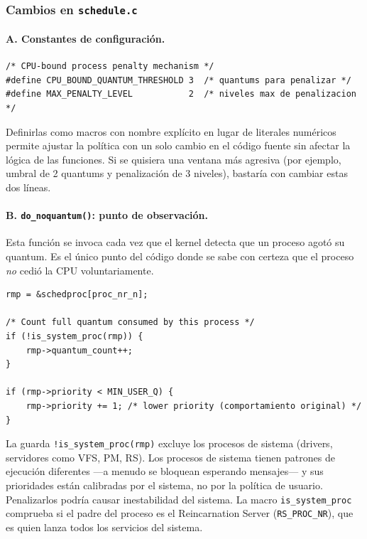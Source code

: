 \documentclass[11pt,a4paper]{article}
\begin{document}
\subsubsection*{Cambios en \texttt{schedule.c}}

\paragraph{A. Constantes de configuraci\'on.}\leavevmode\par

\begin{lstlisting}[style=cstyle,caption={Constantes de la pol\'itica de penalizaci\'on}]
/* CPU-bound process penalty mechanism */
#define CPU_BOUND_QUANTUM_THRESHOLD 3  /* quantums para penalizar */
#define MAX_PENALTY_LEVEL           2  /* niveles max de penalizacion */
\end{lstlisting}

Definirlas como macros con nombre expl\'icito en lugar de literales num\'ericos permite ajustar la pol\'itica con un solo cambio en el c\'odigo fuente sin afectar la l\'ogica de las funciones. Si se quisiera una ventana m\'as agresiva (por ejemplo, umbral de 2 quantums y penalizaci\'on de 3 niveles), bastar\'ia con cambiar estas dos l\'ineas.

\paragraph{B. \texttt{do\_noquantum()}: punto de observaci\'on.}

Esta funci\'on se invoca cada vez que el kernel detecta que un proceso agot\'o su quantum. Es el \'unico punto del c\'odigo donde se sabe con certeza que el proceso \emph{no} cedi\'o la CPU voluntariamente.

\begin{lstlisting}[style=cstyle,caption={Incremento del contador en \texttt{do\_noquantum()}}]
rmp = &schedproc[proc_nr_n];

/* Count full quantum consumed by this process */
if (!is_system_proc(rmp)) {
    rmp->quantum_count++;
}

if (rmp->priority < MIN_USER_Q) {
    rmp->priority += 1; /* lower priority (comportamiento original) */
}
\end{lstlisting}

La guarda \texttt{!is\_system\_proc(rmp)} excluye los procesos de sistema (drivers, servidores como VFS, PM, RS). Los procesos de sistema tienen patrones de ejecuci\'on diferentes ---a menudo se bloquean esperando mensajes--- y sus prioridades est\'an calibradas por el sistema, no por la pol\'itica de usuario. Penalizarlos podr\'ia causar inestabilidad del sistema. La macro \texttt{is\_system\_proc} comprueba si el padre del proceso es el Reincarnation Server (\texttt{RS\_PROC\_NR}), que es quien lanza todos los servicios del sistema.
\end{document}
